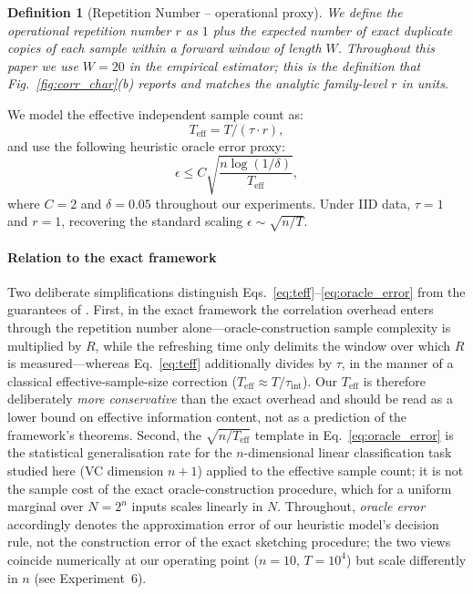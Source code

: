 \documentclass[preprint,12pt,authoryear]{elsarticle}
\newtheorem{definition}{Definition}
\newcommand{\Teff}{T_{\mathrm{eff}}}
\begin{document}
\begin{definition}[Repetition Number -- operational proxy]
We define the \emph{operational repetition number} $r$ as $1$ plus the expected number of \emph{exact duplicate} copies of each sample within a forward window of length $W$. Throughout this paper we use $W = 20$ in the empirical estimator; this is the definition that Fig.~\ref{fig:corr_char}(b) reports and matches the analytic family-level $r$ in units.
\end{definition}

We model the effective independent sample count as:
\begin{equation}
\Teff = T / (\tau \cdot r),
\label{eq:teff}
\end{equation}
and use the following heuristic oracle error proxy:
\begin{equation}
\epsilon \leq C \sqrt{\frac{n \log(1/\delta)}{\Teff}},
\label{eq:oracle_error}
\end{equation}
where $C = 2$ and $\delta = 0.05$ throughout our experiments. Under IID data, $\tau = 1$ and $r = 1$, recovering the standard scaling $\epsilon \sim \sqrt{n/T}$.

\paragraph{Relation to the exact framework} Two deliberate simplifications distinguish Eqs.~\eqref{eq:teff}--\eqref{eq:oracle_error} from the guarantees of \citet{zhao2026exponential}. First, in the exact framework the correlation overhead enters through the repetition number alone---oracle-construction sample complexity is multiplied by $R$, while the refreshing time only delimits the window over which $R$ is measured---whereas Eq.~\eqref{eq:teff} additionally divides by $\tau$, in the manner of a classical effective-sample-size correction ($\Teff \approx T/\tau_{\mathrm{int}}$). Our $\Teff$ is therefore deliberately \emph{more conservative} than the exact overhead and should be read as a lower bound on effective information content, not as a prediction of the framework's theorems. Second, the $\sqrt{n/\Teff}$ template in Eq.~\eqref{eq:oracle_error} is the statistical generalisation rate for the $n$-dimensional linear classification task studied here (VC dimension $n{+}1$) applied to the effective sample count; it is not the sample cost of the exact oracle-construction procedure, which for a uniform marginal over $N = 2^n$ inputs scales linearly in $N$. Throughout, \emph{oracle error} accordingly denotes the approximation error of our heuristic model's decision rule, not the construction error of the exact sketching procedure; the two views coincide numerically at our operating point ($n = 10$, $T = 10^4$) but scale differently in $n$ (see Experiment~6).
\end{document}
